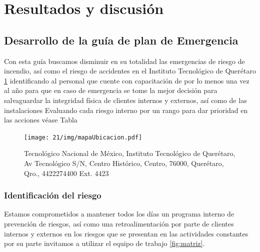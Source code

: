     \section{Resultados y discusión}
    
    \subsection{Desarrollo de la guía de plan de Emergencia}
    
    Con esta guía buscamos disminuir en su totalidad las emergencias de riesgo de incendio, así como el riesgo de accidentes en el Instituto Tecnológico de Querétaro \ref{fig:mapaUbicacion} identificando al personal que cuente con capacitación de por lo menos una vez al año para que en caso de emergencia se tome la mejor decisión para salvaguardar la integridad física de clientes internos y externos, así como de las instalaciones
    Evaluando cada riesgo interno por un rango para dar prioridad en las acciones véase Tabla %
    
    
    \begin{figure}[H]
        \centering
        \texttt{[image: 21/img/mapaUbicacion.pdf]}
        \caption{Tecnológico Nacional de México, Instituto Tecnológico de Querétaro, Av Tecnológico S/N, Centro Histórico, Centro, 76000, Querétaro, Qro., 4422274400 Ext. 4423}
        \label{fig:mapaUbicacion}
    \end{figure}
    
    \subsubsection{Identificación del riesgo}
    
    Estamos comprometidos a mantener todos los días un programa interno de prevención de riesgos, así como una retroalimentación por parte de clientes internos y externos en los riesgos que se presentan en las actividades constantes por su parte invitamos a utilizar el equipo de trabajo \ref{fig:matriz}.
    
